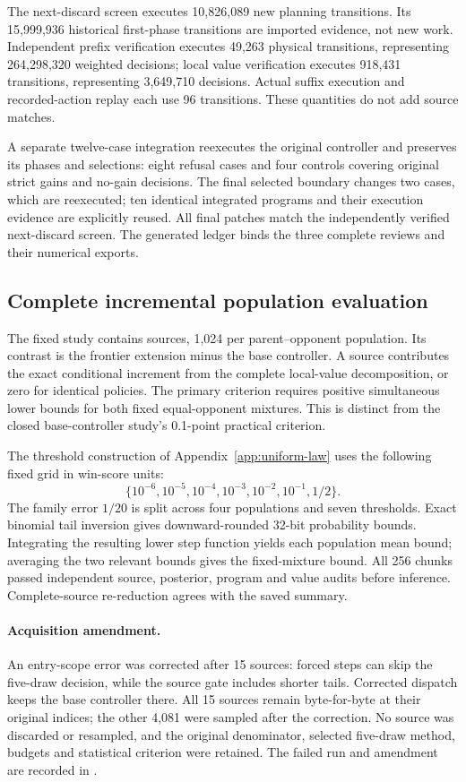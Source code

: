The next-discard screen executes 10,826,089 new planning transitions. Its
15,999,936 historical first-phase transitions are imported evidence, not new
work. Independent prefix verification executes 49,263 physical transitions,
representing 264,298,320 weighted decisions; local value verification executes
918,431 transitions, representing 3,649,710 decisions. Actual suffix execution
and recorded-action replay each use 96 transitions. These quantities do not
add source matches.

A separate twelve-case integration reexecutes the original controller and
preserves its phases and selections: eight refusal cases and four controls
covering original strict gains and no-gain decisions. The final selected
boundary changes two cases, which are reexecuted; ten identical integrated
programs and their execution evidence are explicitly reused. All final patches
match the independently verified next-discard screen. The generated ledger
 binds the three
complete reviews and their numerical exports.

\subsection{Complete incremental population evaluation}
The fixed study contains \FrontierIncrementSources{} sources, 1,024 per
parent--opponent population. Its contrast is the frontier extension minus
the base controller. A source contributes the exact conditional increment
from the complete local-value decomposition, or zero for identical policies.
The primary criterion requires positive simultaneous lower bounds for both
fixed equal-opponent mixtures. This is distinct from the closed
base-controller study's 0.1-point practical criterion.

The threshold construction of Appendix~\ref{app:uniform-law} uses the following fixed grid in win-score units:
\[
\{10^{-6},10^{-5},10^{-4},10^{-3},10^{-2},10^{-1},1/2\}.
\]
The family error $1/20$ is split across four populations and seven thresholds.
Exact binomial tail inversion gives downward-rounded 32-bit probability
bounds. Integrating the resulting lower step function yields each population
mean bound; averaging the two relevant bounds gives the fixed-mixture bound.
All 256 chunks passed independent source, posterior, program and value audits
before inference. Complete-source re-reduction agrees with the saved summary.

\paragraph{Acquisition amendment.}
An entry-scope error was corrected after 15 sources: forced steps can skip the
five-draw decision, while the source gate includes shorter tails. Corrected
dispatch keeps the base controller there. All 15 sources remain byte-for-byte
at their original indices; the other 4,081 were sampled after the correction.
No source was discarded or resampled, and the original denominator, selected
five-draw method, budgets and statistical criterion were retained. The failed
run and amendment are recorded in
.

